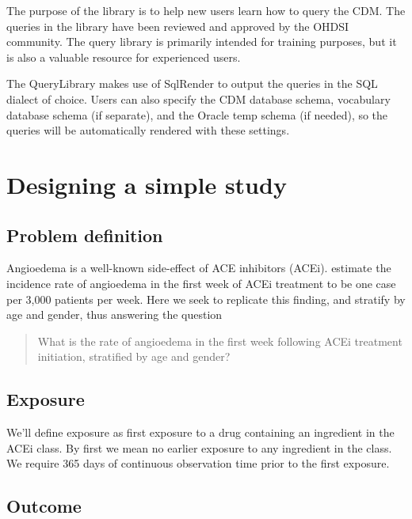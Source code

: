\documentclass[11pt]{book}
\theoremstyle{definition}
\theoremstyle{definition}
\theoremstyle{definition}
\theoremstyle{remark}
\begin{document}
The purpose of the library is to help new users learn how to query the CDM. The queries in the library have been reviewed and approved by the OHDSI community. The query library is primarily intended for training purposes, but it is also a valuable resource for experienced users.

The QueryLibrary makes use of SqlRender to output the queries in the SQL dialect of choice. Users can also specify the CDM database schema, vocabulary database schema (if separate), and the Oracle temp schema (if needed), so the queries will be automatically rendered with these settings.

\hypertarget{designing-a-simple-study}{%
\section{Designing a simple study}\label{designing-a-simple-study}}

\hypertarget{problem-definition}{%
\subsection{Problem definition}\label{problem-definition}}

Angioedema is a well-known side-effect of ACE inhibitors (ACEi). \citet{slater_1988} estimate the incidence rate of angioedema in the first week of ACEi treatment to be one case per 3,000 patients per week. Here we seek to replicate this finding, and stratify by age and gender, thus answering the question

\begin{quote}
What is the rate of angioedema in the first week following ACEi treatment initiation, stratified by age and gender?
\end{quote}

\hypertarget{exposure}{%
\subsection{Exposure}\label{exposure}}

We'll define exposure as first exposure to a drug containing an ingredient in the ACEi class. By first we mean no earlier exposure to any ingredient in the class. We require 365 days of continuous observation time prior to the first exposure.

\hypertarget{outcome}{%
\subsection{Outcome}\label{outcome}}
\end{document}
